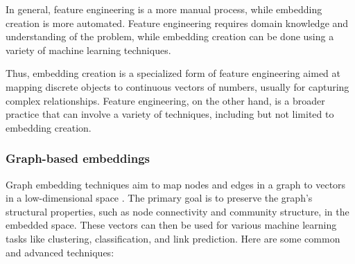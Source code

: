     In general, feature engineering is a more manual process, while embedding creation is more automated. Feature engineering requires domain knowledge and understanding of the problem, while embedding creation can be done using a variety of machine learning techniques.

    Thus, embedding creation is a specialized form of feature engineering aimed at mapping discrete objects to continuous vectors of numbers, usually for capturing complex relationships. Feature engineering, on the other hand, is a broader practice that can involve a variety of techniques, including but not limited to embedding creation.

    \subsubsection{Graph-based embeddings}
    Graph embedding techniques aim to map nodes and edges in a graph to vectors in a low-dimensional space \cite{KG21}. The primary goal is to preserve the graph's structural properties, such as node connectivity and community structure, in the embedded space. These vectors can then be used for various machine learning tasks like clustering, classification, and link prediction. Here are some common and advanced techniques:

    

